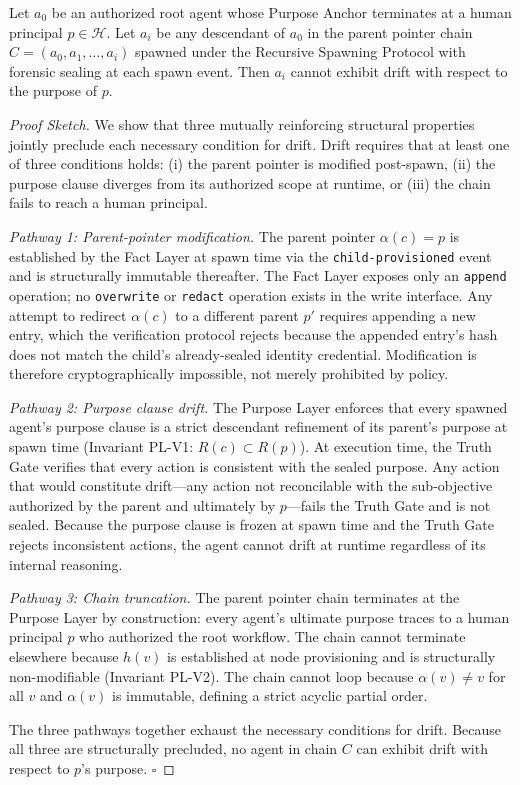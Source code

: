\begin{theorem}
\label{th:drift-prevention}
Let $a_0$ be an authorized root agent whose Purpose Anchor terminates at a human principal $p \in \mathcal{H}$. Let $a_i$ be any descendant of $a_0$ in the parent pointer chain $C = (a_0, a_1, \ldots, a_i)$ spawned under the Recursive Spawning Protocol with forensic sealing at each spawn event. Then $a_i$ cannot exhibit drift with respect to the purpose of $p$.
\end{theorem}

\begin{proof}[Proof Sketch]
We show that three mutually reinforcing structural properties jointly preclude each necessary condition for drift. Drift requires that at least one of three conditions holds: (i) the parent pointer is modified post-spawn, (ii) the purpose clause diverges from its authorized scope at runtime, or (iii) the chain fails to reach a human principal.

\textit{Pathway 1: Parent-pointer modification.} The parent pointer $\alpha(c) = p$ is established by the Fact Layer at spawn time via the \texttt{child-provisioned} event and is structurally immutable thereafter. The Fact Layer exposes only an \texttt{append} operation; no \texttt{overwrite} or \texttt{redact} operation exists in the write interface. Any attempt to redirect $\alpha(c)$ to a different parent $p'$ requires appending a new entry, which the verification protocol rejects because the appended entry's hash does not match the child's already-sealed identity credential. Modification is therefore cryptographically impossible, not merely prohibited by policy.

\textit{Pathway 2: Purpose clause drift.} The Purpose Layer enforces that every spawned agent's purpose clause is a strict descendant refinement of its parent's purpose at spawn time (Invariant PL-V1: $R(c) \subset R(p)$). At execution time, the Truth Gate verifies that every action is consistent with the sealed purpose. Any action that would constitute drift---any action not reconcilable with the sub-objective authorized by the parent and ultimately by $p$---fails the Truth Gate and is not sealed. Because the purpose clause is frozen at spawn time and the Truth Gate rejects inconsistent actions, the agent cannot drift at runtime regardless of its internal reasoning.

\textit{Pathway 3: Chain truncation.} The parent pointer chain terminates at the Purpose Layer by construction: every agent's ultimate purpose traces to a human principal $p$ who authorized the root workflow. The chain cannot terminate elsewhere because $h(v)$ is established at node provisioning and is structurally non-modifiable (Invariant PL-V2). The chain cannot loop because $\alpha(v) \neq v$ for all $v$ and $\alpha(v)$ is immutable, defining a strict acyclic partial order.

The three pathways together exhaust the necessary conditions for drift. Because all three are structurally precluded, no agent in chain $C$ can exhibit drift with respect to $p$'s purpose. $\square$
\end{proof}

